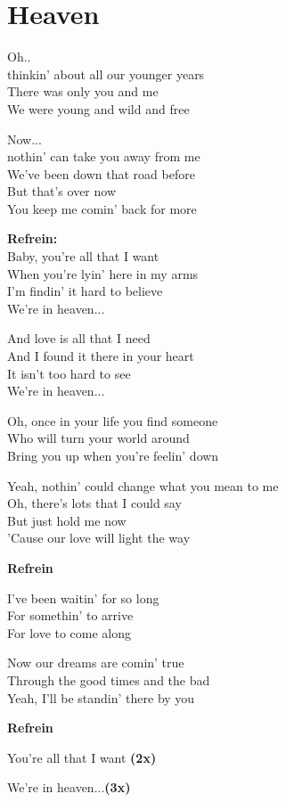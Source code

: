 \section{Heaven}
Oh..\\
thinkin' about all our younger years\\
There was only you and me\\
We were young and wild and free

Now...\\
nothin' can take you away from me\\
We've been down that road before\\
But that's over now\\
You keep me comin' back for more

\textbf{Refrein:}\\
Baby, you're all that I want\\
When you're lyin' here in my arms\\
I'm findin' it hard to believe\\
We're in heaven...

And love is all that I need\\
And I found it there in your heart\\
It isn't too hard to see\\
We're in heaven...

Oh, once in your life you find someone\\
Who will turn your world around\\
Bring you up when you're feelin' down

Yeah, nothin' could change what you mean to me\\
Oh, there's lots that I could say\\
But just hold me now\\
'Cause our love will light the way

\textbf{Refrein}

I've been waitin' for so long\\
For somethin' to arrive\\
For love to come along

Now our dreams are comin' true\\
Through the good times and the bad\\
Yeah, I'll be standin' there by you

\textbf{Refrein}

You're all that I want \textbf{(2x)}

We're in heaven...\textbf{(3x)}